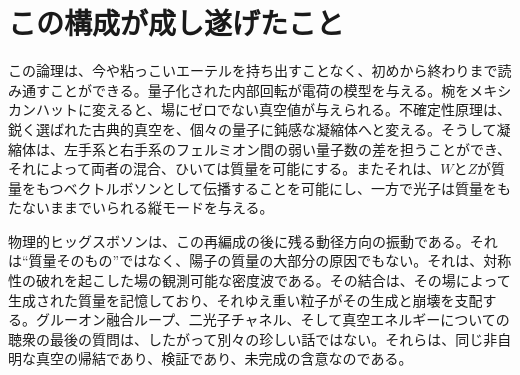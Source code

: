 \begin{classroomqa}
\end{classroomqa}

\begin{classroomqa}
\end{classroomqa}

\section{この構成が成し遂げたこと}

この論理は、今や粘っこいエーテルを持ち出すことなく、初めから終わりまで読み通すことができる。量子化された内部回転が電荷の模型を与える。椀をメキシカンハットに変えると、場にゼロでない真空値が与えられる。不確定性原理は、鋭く選ばれた古典的真空を、個々の量子に鈍感な凝縮体へと変える。そうして凝縮体は、左手系と右手系のフェルミオン間の弱い量子数の差を担うことができ、それによって両者の混合、ひいては質量を可能にする。またそれは、$W$と$Z$が質量をもつベクトルボソンとして伝播することを可能にし、一方で光子は質量をもたないままでいられる縦モードを与える。

物理的ヒッグスボソンは、この再編成の後に残る動径方向の振動である。それは``質量そのもの''ではなく、陽子の質量の大部分の原因でもない。それは、対称性の破れを起こした場の観測可能な密度波である。その結合は、その場によって生成された質量を記憶しており、それゆえ重い粒子がその生成と崩壊を支配する。グルーオン融合ループ、二光子チャネル、そして真空エネルギーについての聴衆の最後の質問は、したがって別々の珍しい話ではない。それらは、同じ非自明な真空の帰結であり、検証であり、未完成の含意なのである。

